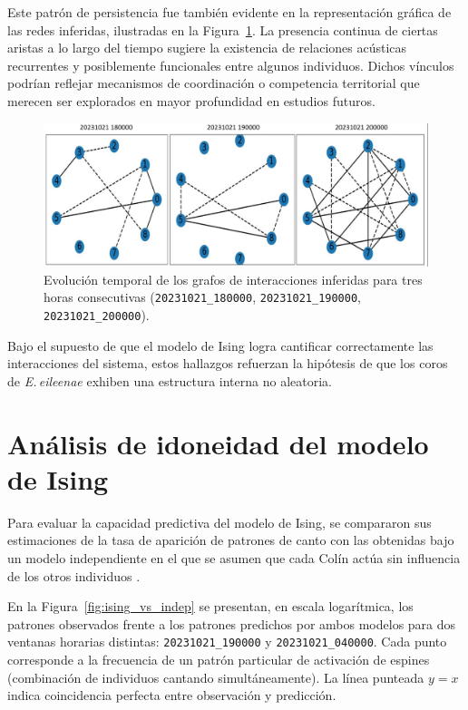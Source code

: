 Este patrón de persistencia fue también evidente en la 
representación gráfica de las redes inferidas, ilustradas en la 
Figura~\ref{fig:graph_evol}. La presencia continua de ciertas 
aristas a lo largo del tiempo sugiere la existencia de 
relaciones acústicas recurrentes y posiblemente funcionales 
entre algunos individuos. Dichos vínculos podrían reflejar 
mecanismos de coordinación o competencia territorial que 
merecen ser explorados en mayor profundidad en estudios futuros.

\begin{figure}[ht]
    \centering
    \includegraphics[width=\columnwidth]{Graphics/3_graphs.jpg}
    \caption{Evolución temporal de los grafos de interacciones inferidas para tres horas consecutivas (\texttt{20231021\_180000}, \texttt{20231021\_190000}, \texttt{20231021\_200000}).}
    \label{fig:graph_evol}
\end{figure}

Bajo el supuesto de que el modelo de Ising logra cantificar correctamente
las interacciones del sistema, estos hallazgos refuerzan la hipótesis de 
que los coros de 
\emph{E.\,eileenae} exhiben una estructura interna no aleatoria.


\section{Análisis de idoneidad del modelo de Ising}
\label{sec:res_idoneidad}


Para evaluar la capacidad predictiva del modelo de Ising, se 
compararon sus estimaciones de la tasa de aparición de patrones 
de canto con las obtenidas bajo un modelo independiente en el 
que se asumen que cada Colín actúa sin influencia de los otros individuos 
\cite{schneidman2006weak}.

En la Figura~\ref{fig:ising_vs_indep} se presentan, en escala logarítmica, 
los patrones observados frente a los patrones predichos por 
ambos modelos para dos ventanas horarias distintas: \texttt{20231021\_190000}
y \texttt{20231021\_040000}. Cada punto corresponde a la frecuencia de un patrón 
particular de activación de espines (combinación de individuos 
cantando simultáneamente). La línea punteada \(y=x\) indica 
coincidencia perfecta entre observación y predicción.

